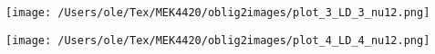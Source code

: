\vspace{0.5cm} %

\noindent
\begin{minipage}[t]{0.45\linewidth}
    \texttt{[image: /Users/ole/Tex/MEK4420/oblig2images/plot\_3\_LD\_3\_nu12.png]}
\end{minipage}
\hspace{0.05\linewidth}
\begin{minipage}[t]{0.45\linewidth}
    \texttt{[image: /Users/ole/Tex/MEK4420/oblig2images/plot\_4\_LD\_4\_nu12.png]}
\end{minipage}


